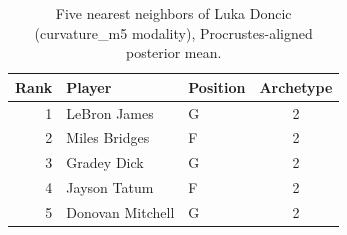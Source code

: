 \begin{table}[htbp]
  \centering\small
  \begin{tabular}{rllc}
    \toprule
    Rank & Player & Position & Archetype \\
    \midrule
    1 & LeBron James & G & 2 \\
    2 & Miles Bridges & F & 2 \\
    3 & Gradey Dick & G & 2 \\
    4 & Jayson Tatum & F & 2 \\
    5 & Donovan Mitchell & G & 2 \\
    \bottomrule
  \end{tabular}
  \caption{Five nearest neighbors of Luka Doncic (curvature_m5 modality), Procrustes-aligned posterior mean.}
  \label{tab:Luka_Doncic_neighbors_curvature_m5}
\end{table}

